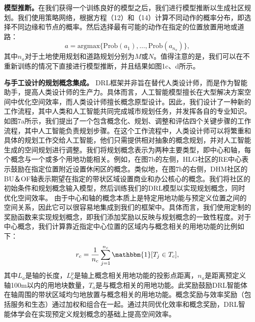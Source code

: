 \textbf{模型推断。}在我们获得一个训练良好的模型之后，我们进行模型推断以生成社区规划。我们使用策略网络，根据方程（12）和（14）计算不同动作的概率分布，即选择不同边缘和节点的概率。然后选择最有可能的动作在指定的位置放置用地或道路：
\begin{equation}
    a = \text{argmax}\{\text{Prob}(a_1),\dots,\text{Prob}(a_{n_{a}})\},
\end{equation}
其中$n_{a}$对于土地使用规划和道路规划分别为$M$或$N$。值得注意的是，我们可以在不重新训练的情况下直接进行模型推断，并且结果如图1c、d所示。

\textbf{与手工设计的规划概念集成。} DRL框架并非旨在替代人类设计师，而是作为智能助手，提高人类设计师的生产力。具体而言，人工智能模型擅长在大型解决方案空间中优化空间效率，而人类设计师擅长概念原型设计。因此，我们设计了一种新的工作流程，其中人类和人工智能共同完成城市规划任务，并发挥各自的专业知识。如图7a所示，我们提出了一个包含概念化、规划、调整和评估四个关键步骤的工作流程，其中人工智能负责规划步骤。在这个工作流程中，人类设计师可以将繁重和具体的规划工作交给人工智能，他们只需提供相对抽象的概念规划，并对人工智能生成的空间规划进行调整。我们将规划概念表示为两种主要类型，即中心和轴，每个概念与一个或多个用地功能相关。例如，在图7b的左侧，HLG社区的RE中心表示鼓励在指定位置附近设置休闲区的概念。类似地，在图7b的右侧，DHM社区的BU＆OF轴表示期望在指定的带状区域设置商业和办公核心的概念。我们将社区的初始条件和规划概念输入模型，然后训练我们的DRL模型以实现规划概念，同时优化空间效率。
由于中心和轴的概念本质上是特定用地功能与预定义位置之间的空间关系，因此它可以很容易地集成到我们的框架中。具体而言，我们使用定制的奖励函数来实现规划概念，即我们添加奖励以反映与规划概念的一致性程度。对于中心概念，我们计算靠近指定中心位置的区域内与概念相关的用地功能的比例如下：
\begin{equation}
    r_c = \frac{1}{n_c}\sum_{j=1}^{n_c}\mathbbm{1}[T_j\in T_c],
\end{equation}
其中$L_a$是轴的长度，$L^p_a$是轴上概念相关用地功能的投影点距离，$n_a$是距离预定义轴100m以内的用地块数量，$T_a$是与概念相关的用地功能。此奖励鼓励DRL智能体在轴周围的带状区域均匀地放置与概念相关的用地功能。概念奖励与效率奖励（包括服务和生态）通过加权和组合在一起。通过共同优化效率和概念奖励，DRL智能体学会在实现预定义规划概念的基础上提高空间效率。
